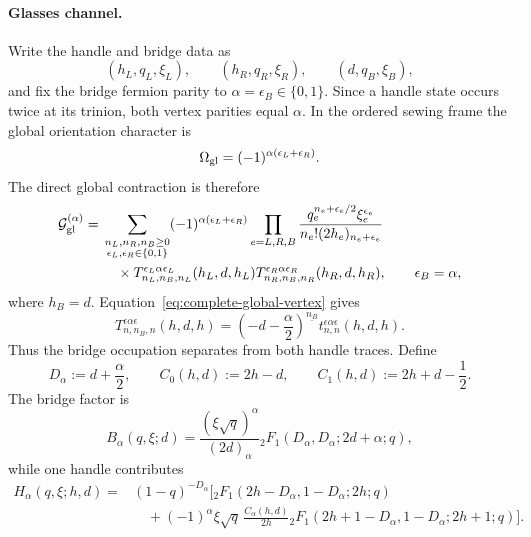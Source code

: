 \documentclass[11pt]{article}
\newcommand{\G}{\mathcal G}
\begin{document}
\paragraph{Glasses channel.}
Write the handle and bridge data as
\begin{equation}
 (h_L,q_L,\xi_L),\qquad (h_R,q_R,\xi_R),\qquad
 (d,q_B,\xi_B),
\end{equation}
and fix the bridge fermion parity to
\(\alpha=\epsilon_B\in\{0,1\}\).  Since a handle state occurs twice at its
trinion, both vertex parities equal \(\alpha\).  In the ordered sewing frame
the global orientation character is
\begin{equation}
 \Omega_{\rm gl}
 =(-1)^{\alpha(\epsilon_L+\epsilon_R)}.
 \label{eq:glasses-global-orientation}
\end{equation}
The direct global contraction is therefore
\begin{align}
 \G_{\rm gl}^{(\alpha)}
 ={}&\sum_{\substack{n_L,n_R,n_B\geq0\\
                     \epsilon_L,\epsilon_R\in\{0,1\}}}
 (-1)^{\alpha(\epsilon_L+\epsilon_R)}
 \prod_{e=L,R,B}
 \frac{q_e^{n_e+\epsilon_e/2}\xi_e^{\epsilon_e}}
      {n_e!(2h_e)_{n_e+\epsilon_e}}
 \nonumber\\
 &\quad\times
 T_{n_L,n_B,n_L}^{\epsilon_L\alpha\epsilon_L}(h_L,d,h_L)
 T_{n_R,n_B,n_R}^{\epsilon_R\alpha\epsilon_R}(h_R,d,h_R),
 \qquad \epsilon_B=\alpha,
 \label{eq:glasses-global-direct-sum}
\end{align}
where \(h_B=d\).  Equation~\eqref{eq:complete-global-vertex} gives
\begin{equation}
 T_{n,n_B,n}^{\epsilon\alpha\epsilon}(h,d,h)
 =\left(-d-\frac\alpha2\right)^{\underline{n_B}}
  t_{n,n}^{\epsilon\alpha\epsilon}(h,d,h).
 \label{eq:glasses-middle-chain-factorization}
\end{equation}
Thus the bridge occupation separates from both handle traces.  Define
\begin{equation}
 D_\alpha:=d+\frac\alpha2,
 \qquad
 C_0(h,d):=2h-d,
 \qquad
 C_1(h,d):=2h+d-\frac12.
 \label{eq:glasses-resummation-parameters}
\end{equation}
The bridge factor is
\begin{equation}
 \boxed{
 B_\alpha(q,\xi;d)
 =\frac{(\xi\sqrt q)^\alpha}{(2d)_\alpha}
 {}_2F_1\!\left(D_\alpha,D_\alpha;2d+\alpha;q\right),}
 \label{eq:glasses-resummed-bridge}
\end{equation}
while one handle contributes
\begin{equation}
 \boxed{\begin{aligned}
 H_\alpha(q,\xi;h,d)
 ={}&(1-q)^{-D_\alpha}
 \Bigg[
 {}_2F_1\!\left(2h-D_\alpha,1-D_\alpha;2h;q\right)
 \\[-2mm]
 &\quad+(-1)^\alpha\xi\sqrt q\,
 \frac{C_\alpha(h,d)}{2h}
 {}_2F_1\!\left(2h+1-D_\alpha,1-D_\alpha;2h+1;q\right)
 \Bigg].
 \end{aligned}}
 \label{eq:glasses-resummed-handle}
\end{equation}
\end{document}
